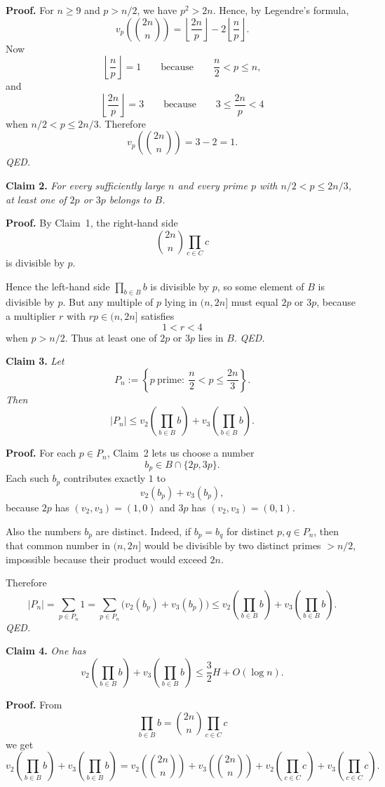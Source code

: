 \medskip
\noindent\textbf{Proof.}
For $n\ge 9$ and $p>n/2$, we have $p^2>2n$.
Hence, by Legendre's formula,
\[
v_p\!\left({2n\choose n}\right)
=
\left\lfloor\frac{2n}{p}\right\rfloor-2\left\lfloor\frac{n}{p}\right\rfloor.
\]
Now
\[
\left\lfloor\frac{n}{p}\right\rfloor=1
\qquad\text{because}\qquad
\frac{n}{2}<p\le n,
\]
and
\[
\left\lfloor\frac{2n}{p}\right\rfloor=3
\qquad\text{because}\qquad
3\le \frac{2n}{p}<4
\]
when $n/2<p\le 2n/3$.
Therefore
\[
v_p\!\left({2n\choose n}\right)=3-2=1.
\]
\hfill\textit{QED.}

\medskip
\noindent\textbf{Claim 2.}
\emph{For every sufficiently large $n$ and every prime $p$ with $n/2<p\le 2n/3$, at least one of $2p$ or $3p$ belongs to $B$.}

\medskip
\noindent\textbf{Proof.}
By Claim~1, the right-hand side
\[
{2n\choose n}\prod_{c\in C} c
\]
is divisible by $p$.

Hence the left-hand side $\prod_{b\in B}b$ is divisible by $p$, so some element of $B$ is divisible by $p$.
But any multiple of $p$ lying in $(n,2n]$ must equal $2p$ or $3p$, because a multiplier $r$ with $rp\in(n,2n]$ satisfies
\[
1<r<4
\]
when $p>n/2$.
Thus at least one of $2p$ or $3p$ lies in $B$.
\hfill\textit{QED.}

\medskip
\noindent\textbf{Claim 3.}
\emph{Let}
\[
P_n:=\left\{p\ \text{prime}:\ \frac{n}{2}<p\le \frac{2n}{3}\right\}.
\]
\emph{Then}
\[
|P_n|\le v_2\!\left(\prod_{b\in B}b\right)+v_3\!\left(\prod_{b\in B}b\right).
\]

\medskip
\noindent\textbf{Proof.}
For each $p\in P_n$, Claim~2 lets us choose a number
\[
b_p\in B\cap\{2p,3p\}.
\]
Each such $b_p$ contributes exactly $1$ to
\[
v_2(b_p)+v_3(b_p),
\]
because $2p$ has $(v_2,v_3)=(1,0)$ and $3p$ has $(v_2,v_3)=(0,1)$.

Also the numbers $b_p$ are distinct.
Indeed, if $b_p=b_q$ for distinct $p,q\in P_n$, then that common number in $(n,2n]$ would be divisible by two distinct primes $>n/2$, impossible because their product would exceed $2n$.

Therefore
\[
|P_n|
=
\sum_{p\in P_n} 1
=
\sum_{p\in P_n}\bigl(v_2(b_p)+v_3(b_p)\bigr)
\le
v_2\!\left(\prod_{b\in B}b\right)+v_3\!\left(\prod_{b\in B}b\right).
\]
\hfill\textit{QED.}

\medskip
\noindent\textbf{Claim 4.}
\emph{One has}
\[
v_2\!\left(\prod_{b\in B}b\right)+v_3\!\left(\prod_{b\in B}b\right)
\le
\frac{3}{2}H+O(\log n).
\]

\medskip
\noindent\textbf{Proof.}
From
\[
\prod_{b\in B} b={2n\choose n}\prod_{c\in C} c
\]
we get
\[
v_2\!\left(\prod_{b\in B}b\right)+v_3\!\left(\prod_{b\in B}b\right)
=
v_2\!\left({2n\choose n}\right)+v_3\!\left({2n\choose n}\right)
+
v_2\!\left(\prod_{c\in C}c\right)+v_3\!\left(\prod_{c\in C}c\right).
\]

